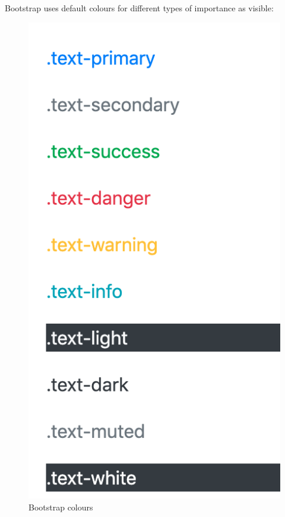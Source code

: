 
Bootstrap uses default colours for different types of importance as visible:

\begin{figure}[htbp]
\begin{minipage}[t]{0.45\linewidth}
    \includegraphics[scale=0.5]{Figures/bootstrap_colours}
    \caption{Bootstrap colours}
    \label{bootstrap_colours}
\end{minipage}%
    \hfill%

\end{figure}
